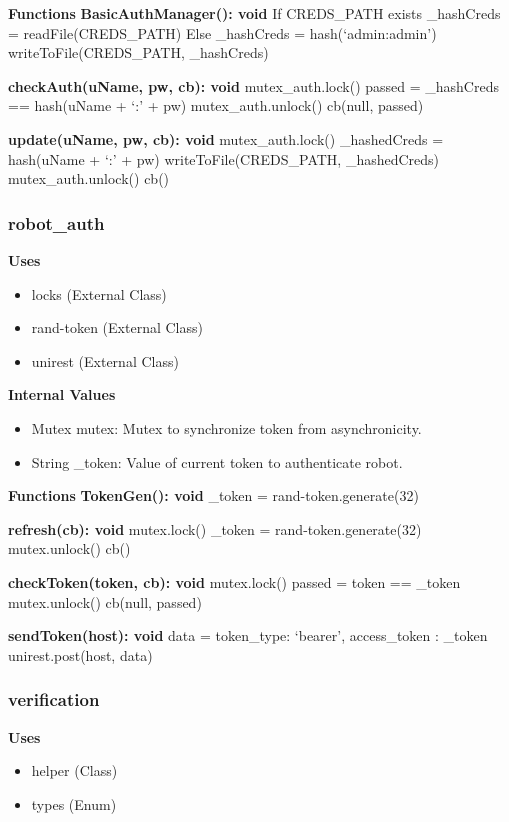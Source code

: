 \documentclass [10pt]{article}
\begin{document}
\textbf{Functions}
\textbf{BasicAuthManager(): void}
If CREDS\_PATH exists
	\_hashCreds = readFile(CREDS\_PATH)
Else
	\_hashCreds = hash(‘admin:admin’)
	writeToFile(CREDS\_PATH, \_hashCreds)

\textbf{checkAuth(uName, pw, cb): void}
mutex\_auth.lock()
passed = \_hashCreds == hash(uName + ‘:’ + pw)
mutex\_auth.unlock()
cb(null, passed)

\textbf{update(uName, pw, cb): void}
mutex\_auth.lock()
\_hashedCreds =  hash(uName + ‘:’ + pw)
writeToFile(CREDS\_PATH, \_hashedCreds)
mutex\_auth.unlock()
cb()

\subsubsection{robot\_auth}
\textbf{Uses}
\begin{itemize}
	\item locks (External Class)
	\item rand-token (External Class)
	\item unirest (External Class)
\end{itemize}

\textbf{Internal Values}
\begin{itemize}
	\item Mutex mutex: Mutex to synchronize token from asynchronicity.
	\item String \_token: Value of current token to authenticate robot.
\end{itemize}

\textbf{Functions}
\textbf{TokenGen(): void}
\_token = rand-token.generate(32)

\textbf{refresh(cb): void}
mutex.lock()
\_token = rand-token.generate(32)
mutex.unlock()
cb()

\textbf{checkToken(token, cb): void}
mutex.lock()
passed = token == \_token
mutex.unlock()
cb(null, passed)

\textbf{sendToken(host): void}
data = {
	token\_type: ‘bearer’,
	access\_token : \_token
}
unirest.post(host, data)

\subsubsection{verification}
\textbf{Uses}
\begin{itemize}
	\item helper (Class)
	\item types (Enum)
\end{itemize}
\end{document}
